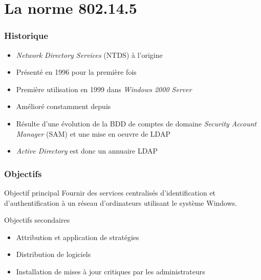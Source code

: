\documentclass{beamer}
\begin{document}
  \section{La norme 802.14.5}
  \begin{frame}
    \frametitle{Historique}
    \begin{itemize}
     \item \textit{Network Directory Services} (NTDS) à l'origine
     \item Présenté en 1996 pour la première fois
     \item Première utilisation en 1999 dans \textit{Windows 2000 Server}
     \item Amélioré constamment depuis
     \item Résulte d'une évolution de la BDD de comptes de domaine \textit{Security Account Manager} (SAM) et une mise en oeuvre de LDAP
     \item \textit{Active Directory} est donc un annuaire LDAP
    \end{itemize}
  \end{frame}
  
  \begin{frame}
    \frametitle{Objectifs}
    \begin{block}{Objectif principal}
     Fournir des services centralisés d'identification et d'authentification à un réseau d'ordinateurs utilisant le système Windows.
    \end{block}
    \begin{block}{Objectifs secondaires}
     \begin{itemize}
      \item Attribution et application de stratégies
      \item Distribution de logiciels
      \item Installation de mises à jour critiques par les administrateurs
     \end{itemize}
    \end{block}
  \end{frame}
\end{document}
